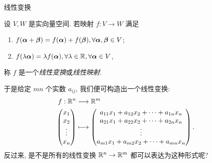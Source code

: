\begin{frame}{线性变换}
	\onslide<+->
	\begin{definition}
		设 $V,W$ 是实向量空间.
		若映射 $f:V\to W$ 满足
		\begin{enumerate}[<*>]
			\item $f({\boldsymbol{\alpha}}+{\boldsymbol{\beta}})=f({\boldsymbol{\alpha}})+f({\boldsymbol{\beta}}),\forall {\boldsymbol{\alpha}},{\boldsymbol{\beta}}\in V$;
			\item $f(\lambda {\boldsymbol{\alpha}})=\lambda f({\boldsymbol{\alpha}}),\forall \lambda\in{\mathbb{R}},\forall{\boldsymbol{\alpha}}\in V$,
		\end{enumerate}
		称 $f$ 是一个\emph{线性变换}或\emph{线性映射}.
	\end{definition}
	\onslide<+->
	于是给定 $mn$ 个实数 $a_{ij}$, 我们便可构造出一个线性变换:
	\onslide<+->
	\begin{align*}
		f:\BR^n&\lra\BR^m\\
		\begin{pmatrix}
			x_1\\
			x_2\\
			\vdots\\
			x_n
		\end{pmatrix}&\lto
		\begin{pmatrix}
			a_{11}x_1+a_{12}x_2+\cdots+a_{1n}x_n\\
			a_{21}x_1+a_{22}x_2+\cdots+a_{2n}x_n\\
			\vvdots\\
			a_{m1}x_1+a_{m2}x_2+\cdots+a_{mn}x_n
		\end{pmatrix}.
	\end{align*}
	\onslide<+->
	反过来, 是不是所有的线性变换 ${\mathbb{R}}^n\rightarrow{\mathbb{R}}^m$ 都可以表达为这种形式呢?
\end{frame}


